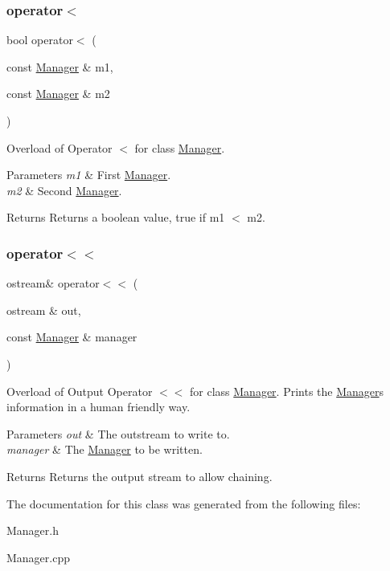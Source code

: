 \subsubsection{\texorpdfstring{operator$<$}{operator<}}
{\footnotesize\ttfamily bool operator$<$ (\begin{DoxyParamCaption}\item[{const \hyperlink{class_manager}{Manager} \&}]{m1,  }\item[{const \hyperlink{class_manager}{Manager} \&}]{m2 }\end{DoxyParamCaption})\hspace{0.3cm}{\ttfamily [friend]}}

Overload of Operator $<$ for class \hyperlink{class_manager}{Manager}. 
\begin{DoxyParams}{Parameters}
{\em m1} & First \hyperlink{class_manager}{Manager}. \\
\hline
{\em m2} & Second \hyperlink{class_manager}{Manager}. \\
\hline
\end{DoxyParams}
\begin{DoxyReturn}{Returns}
Returns a boolean value, true if m1 $<$ m2. 
\end{DoxyReturn}
\hypertarget{class_manager_aa5bf719dafd06d7f39a7c5f34421336d}{}\label{class_manager_aa5bf719dafd06d7f39a7c5f34421336d} 
\subsubsection{\texorpdfstring{operator$<$$<$}{operator<<}}
{\footnotesize\ttfamily ostream\& operator$<$$<$ (\begin{DoxyParamCaption}\item[{ostream \&}]{out,  }\item[{const \hyperlink{class_manager}{Manager} \&}]{manager }\end{DoxyParamCaption})\hspace{0.3cm}{\ttfamily [friend]}}

Overload of Output Operator $<$$<$ for class \hyperlink{class_manager}{Manager}. Prints the \hyperlink{class_manager}{Manager}\textquotesingle{}s information in a human friendly way. 
\begin{DoxyParams}{Parameters}
{\em out} & The outstream to write to. \\
\hline
{\em manager} & The \hyperlink{class_manager}{Manager} to be written. \\
\hline
\end{DoxyParams}
\begin{DoxyReturn}{Returns}
Returns the output stream to allow chaining. 
\end{DoxyReturn}


The documentation for this class was generated from the following files\+:\begin{DoxyCompactItemize}
\item 
Manager.\+h\item 
Manager.\+cpp\end{DoxyCompactItemize}
